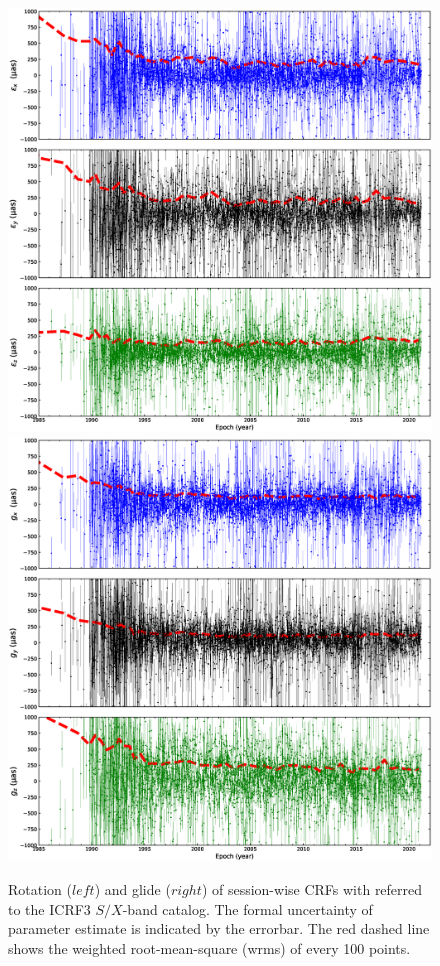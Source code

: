 \documentclass{aa-note}    %
\begin{document}
 \begin{figure}[hbtp]
   \centering
   \includegraphics[width=\columnwidth]{figs/orient-from-sess-crf}  %
   \includegraphics[width=\columnwidth]{figs/glide-from-sess-crf}  %
   \caption[]{\label{fig:sess-wise-pmt} %
	Rotation ($left$) and glide ($right$) of session-wise CRFs with referred to
	the ICRF3 $S/X$-band catalog.
	The formal uncertainty of parameter estimate is indicated by the errorbar.
	The red dashed line shows the weighted root-mean-square (wrms) of every 100 points.
   }
 \end{figure}
\end{document}
